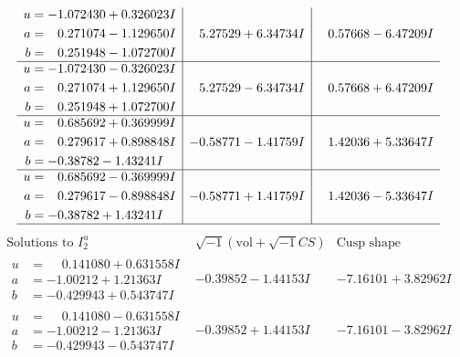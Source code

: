 \documentclass[1p]{elsarticle_modified}
\theoremstyle{definition}
\newcommand{\I}{\sqrt{-1}}
\begin{document}
$$\begin{array}{c|c|c}
\begin{aligned}
u &= -1.072430 + 0.326023 I \\
a &= \phantom{-}0.271074 - 1.129650 I \\
b &= \phantom{-}0.251948 - 1.072700 I\end{aligned}
 & \phantom{-}5.27529 + 6.34734 I & \phantom{-}0.57668 - 6.47209 I \\ \hline\begin{aligned}
u &= -1.072430 - 0.326023 I \\
a &= \phantom{-}0.271074 + 1.129650 I \\
b &= \phantom{-}0.251948 + 1.072700 I\end{aligned}
 & \phantom{-}5.27529 - 6.34734 I & \phantom{-}0.57668 + 6.47209 I \\ \hline\begin{aligned}
u &= \phantom{-}0.685692 + 0.369999 I \\
a &= \phantom{-}0.279617 + 0.898848 I \\
b &= -0.38782 - 1.43241 I\end{aligned}
 & -0.58771 - 1.41759 I & \phantom{-}1.42036 + 5.33647 I \\ \hline\begin{aligned}
u &= \phantom{-}0.685692 - 0.369999 I \\
a &= \phantom{-}0.279617 - 0.898848 I \\
b &= -0.38782 + 1.43241 I\end{aligned}
 & -0.58771 + 1.41759 I & \phantom{-}1.42036 - 5.33647 I\\
 \hline 
 \end{array}$$\newpage$$\begin{array}{c|c|c}  
\text{Solutions to }I^u_{2}& \I (\text{vol} + \sqrt{-1}CS) & \text{Cusp shape}\\
 \hline 
\begin{aligned}
u &= \phantom{-}0.141080 + 0.631558 I \\
a &= -1.00212 + 1.21363 I \\
b &= -0.429943 + 0.543747 I\end{aligned}
 & -0.39852 - 1.44153 I & -7.16101 + 3.82962 I \\ \hline\begin{aligned}
u &= \phantom{-}0.141080 - 0.631558 I \\
a &= -1.00212 - 1.21363 I \\
b &= -0.429943 - 0.543747 I\end{aligned}
 & -0.39852 + 1.44153 I & -7.16101 - 3.82962 I \\ \hline\begin{aligned}

\end{aligned}
\end{array}$$
\end{document}
